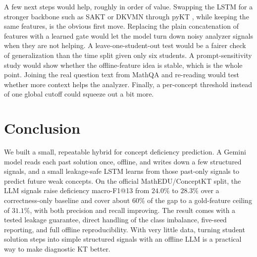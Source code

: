\documentclass[11pt]{article}
\begin{document}
A few next steps would help, roughly in order of value. Swapping the LSTM for a stronger
backbone such as SAKT or DKVMN through pyKT \cite{liu2022pykt}, while keeping
the same features, is the obvious first move. Replacing the plain concatenation of
features with a learned gate would let the model turn down noisy analyzer signals when
they are not helping. A leave-one-student-out test would be a fairer check of
generalization than the time split given only six students. A prompt-sensitivity study
would show whether the offline-feature idea is stable, which is the whole point. Joining
the real question text from MathQA and re-reading would test whether more context helps
the analyzer. Finally, a per-concept threshold instead of one global cutoff could squeeze
out a bit more.

\section{Conclusion}
We built a small, repeatable hybrid for concept deficiency prediction. A Gemini model
reads each past solution once, offline, and writes down a few structured signals, and a
small leakage-safe LSTM learns from those past-only signals to predict future weak
concepts. On the official MathEDU/ConceptKT split, the LLM signals raise deficiency
macro-F1@13 from $24.0\%$ to $28.3\%$ over a correctness-only baseline and cover about
$60\%$ of the gap to a gold-feature ceiling of $31.1\%$, with both precision and recall
improving. The result comes with a tested leakage guarantee, direct handling of the
class imbalance, five-seed reporting, and full offline reproducibility. With very little
data, turning student solution steps into simple structured signals with an offline LLM
is a practical way to make diagnostic KT better.
\end{document}
